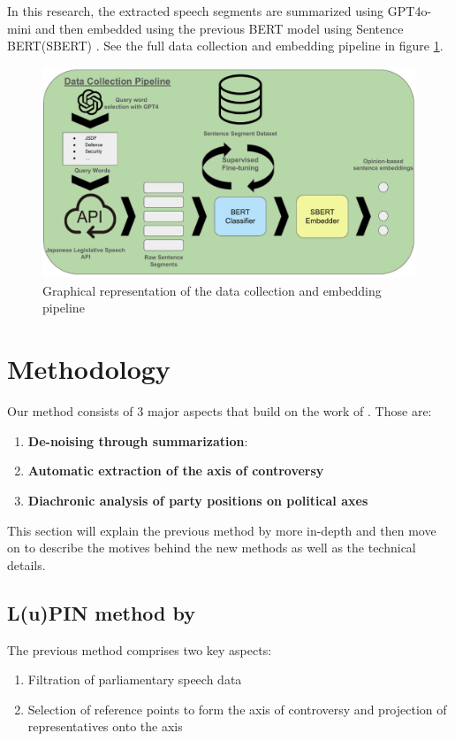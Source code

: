 \documentclass[final,5p,times,twocolumn,authoryear]{elsarticle}
\begin{document}
In this research, the extracted speech segments are summarized using GPT4o-mini and then embedded using the previous BERT model using Sentence BERT(SBERT) \citep{reimers2019sentencebert}. See the full data collection and embedding pipeline in figure \ref{fig:data-collection-phase}.

\begin{figure}[h]
\centering
  \centering
  \includegraphics[width=1\linewidth]{figs/data collection pipeline.pdf}
  \caption{Graphical representation of the data collection and embedding pipeline}
  \label{fig:data-collection-phase}
\end{figure}

\section{Methodology}


Our method consists of 3 major aspects that build on the work of \citeauthor{kato2024lupinllmbasedpoliticalideology}. Those are:
\begin{enumerate}
    \item \textbf{De-noising through summarization}:  
    \item \textbf{Automatic extraction of the axis of controversy}
    \item \textbf{Diachronic analysis of party positions on political axes}
\end{enumerate}

This section will explain the previous method by \citeauthor{kato2024lupinllmbasedpoliticalideology} more in-depth and then move on to describe the motives behind the new methods as well as the technical details. 

\subsection{L(u)PIN method by \citeauthor{kato2024lupinllmbasedpoliticalideology}}
\label{section: lupin method}
The previous method comprises two key aspects:
\begin{enumerate}
    \item Filtration of parliamentary speech data
    \item Selection of reference points to form the axis of controversy and projection of representatives onto the axis
\end{enumerate}
\end{document}
